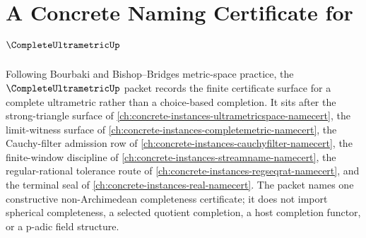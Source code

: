 \chapter{A Concrete Naming Certificate for $\CompleteUltrametricUp$}
\label{ch:concrete-instances-complete-ultrametric-namecert}

Following Bourbaki and Bishop--Bridges metric-space practice, the $\CompleteUltrametricUp$ packet records the finite certificate surface for a complete ultrametric rather than a choice-based completion. It sits after the strong-triangle surface of \autoref{ch:concrete-instances-ultrametricspace-namecert}, the limit-witness surface of \autoref{ch:concrete-instances-completemetric-namecert}, the Cauchy-filter admission row of \autoref{ch:concrete-instances-cauchyfilter-namecert}, the finite-window discipline of \autoref{ch:concrete-instances-streamname-namecert}, the regular-rational tolerance route of \autoref{ch:concrete-instances-regseqrat-namecert}, and the terminal seal of \autoref{ch:concrete-instances-real-namecert}. The packet names one constructive non-Archimedean completeness certificate; it does not import spherical completeness, a selected quotient completion, a host completion functor, or a p-adic field structure.

